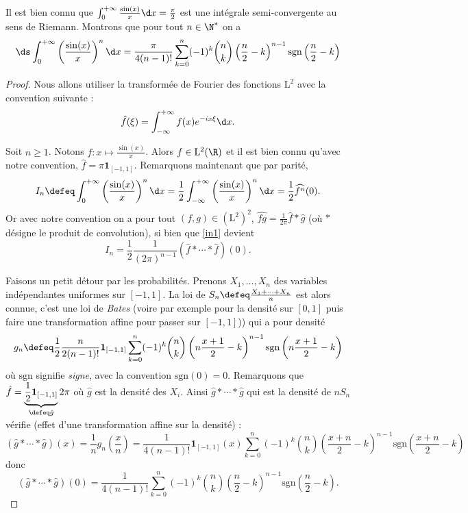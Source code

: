 \documentclass{notes}
\begin{document}

Il est bien connu que $\int_{0}^{+\infty} \frac{\sin(x)}{x} \d x = \frac{\pi}{2}$ est une intégrale semi-convergente au sens de Riemann. Montrons que pour tout $n\in\N^{*}$ on a 
\[ \ds\int_0^{+\infty} \left( \frac{\sin(x)}{x} \right)^{n}\d x = \frac{\pi}{4(n-1)!}  \sum_{k=0}^{n} (-1)^{k}\binom nk \left( \frac n2 - k \right)^{n-1}\mathrm{sgn}\left( \frac n2 - k \right)\] 

\begin{proof}
  Nous allons utiliser la transformée de Fourier des fonctions $\mathrm L^{2}$ avec la convention suivante : 
  \[ \hat f(\xi) = \int_{-\infty}^{+\infty} f(x) e^{-ix \xi} \d x. \]

  Soit $n\geq 1$. Notons $f\colon x \mapsto \frac{\sin(x)}{x}$. Alors $f\in\mathrm L^{2}(\R)$ et il est bien connu qu'avec notre convention, $\hat f = \pi \mathbf 1_{[-1,1]}$. Remarquons maintenant que par parité, 
  \begin{equation}
    \label{in1}
    I_n \defeq \int_{0}^{+\infty} \left( \frac{\sin(x)}{x} \right)^{n} \d x = \frac 12 \int_{-\infty}^{+\infty} \left( \frac{\sin(x)}{x} \right)^{n} \d x = \frac 12 \widehat{f^{n}}(0). 
  \end{equation}
  Or avec notre convention on a pour tout $(f,g)\in (\mathrm L^{2})^{2}$, $\widehat{fg}= \frac 1{2\pi} \hat f \ast \hat g$ (où $\ast$ désigne le produit de convolution), si bien que \eqref{in1} devient  
  \begin{equation}
    \label{in2}
    I_n = \frac 12 \frac{1}{(2\pi)^{n-1}} \left( \hat f\ast \cdots \ast \hat  f \right)(0).
  \end{equation}

  Faisons un petit détour par les probabilités. Prenons $X_1,\dots,X_n$ des variables indépendantes uniformes sur $[-1,1]$. La loi de $S_n \defeq \frac{X_1+\cdots+X_n}{n}$ est alors connue, c'est une loi de \emph{Bates} (voire par exemple \cite{JKB} pour la densité sur $[0,1]$ puis faire une transformation affine pour passer sur $[-1,1]$)) qui a pour densité 
  \[ g_{n} \defeq  \frac 12 \frac{n}{2(n-1)!}  \mathbf 1_{[-1,1]} \sum_{k=0}^{n} (-1)^{k} \binom nk \left( n\frac{x+1}{2}- k \right)^{n-1} \mathrm{sgn}\left( n\frac{x+1}{2}- k \right) \]
  où $\mathrm{sgn}$ signifie \emph{signe}, avec la convention $\text{sgn}(0)=0$. Remarquons que $\hat f = \underbrace{\frac 12 \mathbf 1_{[-1,1]}}_{\defeq \hat g} 2\pi$ où $\hat g$ est la densité des $X_i$. Ainsi $\hat g \ast \cdots \ast \hat g$ qui est la densité de $nS_n$ vérifie (effet d'une transformation affine sur la densité) : 
  \[ \left( \hat g \ast \cdots \ast \hat g \right)(x) = \frac 1n g_{n}\left( \frac xn \right) =  \frac 1{4(n-1)!} \mathbf 1_{[-1,1]}(x) \sum_{k=0}^{n} (-1)^{k} \binom nk \left( \frac{x+n}{2}-k \right)^{n-1} \mathrm{sgn} \left( \frac{x+n}{2}-k  \right) \] 
  donc \[ \left( \hat g\ast \cdots \ast \hat g \right)(0) = \frac 1{4(n-1)!} \sum_{k=0}^{n} (-1)^{k}\binom nk \left( \frac n2 - k \right)^{n-1}\mathrm{sgn} \left( \frac n2 - k \right). \]


\end{proof}
\end{document}
